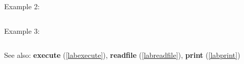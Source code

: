 \noindent Example 2: 
\begin{center}\begin{minipage}{15cm}\begin{Verbatim}[frame=single]
\end{Verbatim}
\end{minipage}\end{center}
\noindent Example 3: 
\begin{center}\begin{minipage}{15cm}\begin{Verbatim}[frame=single]
\end{Verbatim}
\end{minipage}\end{center}
See also: \textbf{execute} (\ref{labexecute}), \textbf{readfile} (\ref{labreadfile}), \textbf{print} (\ref{labprint})
